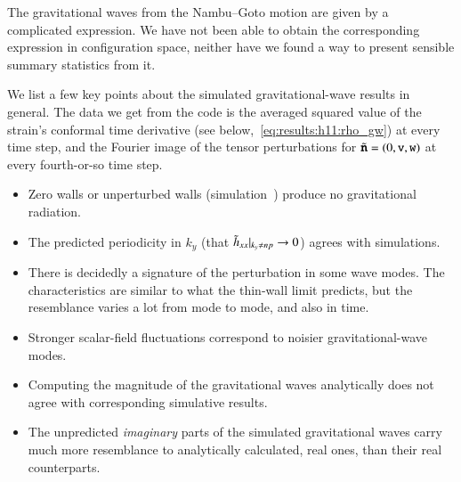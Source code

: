 


\newcommand{\polplus}{\ALIASpolplus}
\newcommand{\polcross}{\ALIASpolcross}
\newcommand\sppt{\ALIASsppt}
\newcommand\Ft{\ALIASFt}
\newcommand{\hpAB}{\ALIAShpAB}
\newcommand{\hpA}{\ALIAShpA}
\newcommand{\hpB}{\ALIAShpB}
\newcommand{\hpC}{\ALIAShpC}
\newcommand{\hpCR}{\ALIAShpCR}
\newcommand{\hpCI}{\ALIAShpCI}
\newcommand{\dummy}{\ALIASdummy}




The gravitational waves from the Nambu--Goto motion are given by a complicated expression. We have not been able to obtain the corresponding expression in configuration space, neither have we found a way to present sensible summary statistics from it. 

We list a few key points about the simulated gravitational-wave results in general. The data we get from the code is the averaged squared value of the strain's conformal time derivative (see below,~\cref{eq:results:h11:rho_gw}) at every time step, and the Fourier image of the tensor perturbations for $\tilde{\boldsymbol{\mathtt{n}}} = (0,\mathtt{v}, \mathtt{w})$ at every fourth-or-so time step.
\begin{itemize}
    \item Zero walls or unperturbed walls (simulation~) produce no gravitational radiation.
    \item The predicted periodicity in $k_y$ (that $\Ft{h}_{xx}\rvert_{k_y\neq np} \to 0 $) agrees with simulations. 
    \item There is decidedly a signature of the perturbation in some wave modes. The characteristics are similar to what the thin-wall limit predicts, but the resemblance varies a lot from mode to mode, and also in time.
    \item Stronger scalar-field fluctuations correspond to noisier gravitational-wave modes.
    \item Computing the magnitude of the gravitational waves analytically does not agree with corresponding simulative results. 
    \item The unpredicted \emph{imaginary} parts of the simulated gravitational waves carry much more resemblance to analytically calculated, real ones, than their real counterparts.
\end{itemize}


